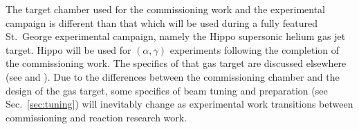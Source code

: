The target chamber used for the commissioning work and the experimental
campaign is different than that which will be used during a fully featured St.\
George experimental campaign, namely the Hippo supersonic helium gas jet
target. Hippo will be used for $(\alpha,\gamma)$ experiments following the
completion of the commissioning work. The specifics of that gas target are
discussed elsewhere (see \cite{Kontos2012} and \cite{Meisel2016}). Due to the
differences between the commissioning chamber and the design of the gas target,
some specifics of beam tuning and preparation (see Sec.~\ref{sec:tuning}) will
inevitably change as experimental work transitions between commissioning and
reaction research work.
